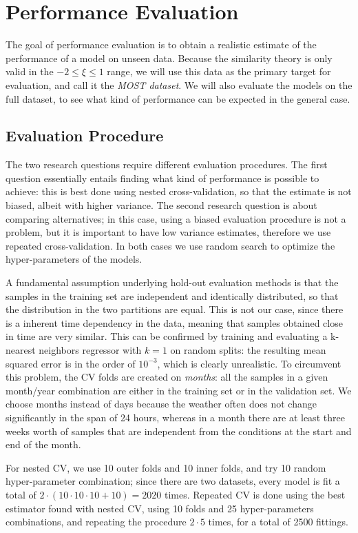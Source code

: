 \documentclass[a4paper,11pt]{kth-mag}
\begin{document}
\section{Performance Evaluation}
\label{sec:perf_eval}
The goal of performance evaluation is to obtain a realistic estimate of the performance of a model on unseen data. Because the similarity theory is only valid in the $-2\leq\xi\leq1$ range, we will use this data as the primary target for evaluation, and call it the \emph{MOST dataset}. We will also evaluate the models on the full dataset, to see what kind of performance can be expected in the general case.

\subsection{Evaluation Procedure}
The two research questions require different evaluation procedures. The first question essentially entails finding what kind of performance is possible to achieve: this is best done using nested cross-validation, so that the estimate is not biased, albeit with higher variance. The second research question is about comparing alternatives; in this case, using a biased evaluation procedure is not a problem, but it is important to have low variance estimates, therefore we use repeated cross-validation. In both cases we use random search \citep{random_search} to optimize the hyper-parameters of the models.

A fundamental assumption underlying hold-out evaluation methods is that the samples in the training set are independent and identically distributed, so that the distribution in the two partitions are equal. This is not our case, since there is a inherent time dependency in the data, meaning that samples obtained close in time are very similar. This can be confirmed by training and evaluating a k-nearest neighbors regressor with $k=1$ on random splits: the resulting mean squared error is in the order of $10^{-3}$, which is clearly unrealistic. To circumvent this problem, the CV folds are created on \emph{months}: all the samples in a given month/year combination are either in the training set or in the validation set. We choose months instead of days because the weather often does not change significantly in the span of 24 hours, whereas in a month there are at least three weeks worth of samples that are independent from the conditions at the start and end of the month.

For nested CV, we use 10 outer folds and 10 inner folds, and try 10 random hyper-parameter combination; since there are two datasets, every model is fit a total of $2\cdot(10\cdot10\cdot10+10)=2020$ times. Repeated CV is done using the best estimator found with nested CV, using 10 folds and 25 hyper-parameters combinations, and repeating the procedure $2\cdot5$ times, for a total of 2500 fittings.
\end{document}
